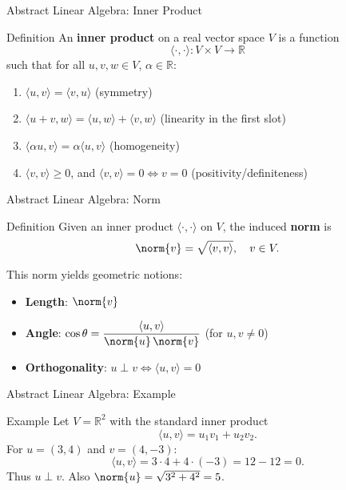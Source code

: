 \blueheader
\begin{frame}{Abstract Linear Algebra: Inner Product}
\begin{blue*}{Definition}
An \textbf{inner product} on a real vector space $V$ is a function
\[
\langle \cdot, \cdot \rangle : V \times V \to \mathbb{R}
\]
such that for all $u,v,w \in V$, $\alpha \in \mathbb{R}$:
\begin{enumerate}
    \item $\langle u,v \rangle = \langle v,u \rangle$ \hfill (symmetry)
    \item $\langle u+v,w \rangle = \langle u,w \rangle + \langle v,w \rangle$ \hfill (linearity in the first slot)
    \item $\langle \alpha u, v \rangle = \alpha \langle u,v \rangle$ \hfill (homogeneity)
    \item $\langle v,v \rangle \ge 0$, and $\langle v,v \rangle = 0 \iff v=0$ \hfill (positivity/definiteness)
\end{enumerate}
\end{blue*}
\end{frame}

\redheader
\begin{frame}{Abstract Linear Algebra: Norm}
\begin{red*}{Definition}
Given an inner product $\langle \cdot, \cdot \rangle$ on $V$, the induced \textbf{norm} is
\[
\norm{v} = \sqrt{\langle v, v \rangle}, \quad v \in V.
\]

This norm yields geometric notions:
\begin{itemize}
    \item \textbf{Length}: $\norm{v}$
    \item \textbf{Angle}: $\displaystyle \cos \theta = \frac{\langle u, v \rangle}{\norm{u}\,\norm{v}}$ (for $u,v\neq 0$)
    \item \textbf{Orthogonality}: $u \perp v \iff \langle u, v \rangle = 0$
\end{itemize}
\end{red*}
\end{frame}

\greenheader
\begin{frame}{Abstract Linear Algebra: Example}
\begin{green*}{Example}
Let $V = \mathbb{R}^2$ with the standard inner product
\[
\langle u, v \rangle = u_1 v_1 + u_2 v_2.
\]
For $u = (3,4)$ and $v = (4,-3)$:
\[
\langle u, v \rangle = 3 \cdot 4 + 4 \cdot (-3) = 12 - 12 = 0.
\]
Thus $u \perp v$. Also $\norm{u} = \sqrt{3^2+4^2}=5$.
\end{green*}
\end{frame}

